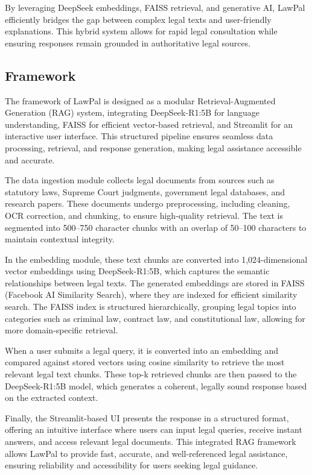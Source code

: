 By leveraging DeepSeek embeddings, FAISS retrieval, and generative AI, LawPal efficiently bridges the gap between complex legal texts and user-friendly explanations. This hybrid system allows for rapid legal consultation while ensuring responses remain grounded in authoritative legal sources.

\subsection{Framework}\label{AA} 

The framework of LawPal is designed as a modular Retrieval-Augmented Generation (RAG) system, integrating DeepSeek-R1:5B for language understanding, FAISS for efficient vector-based retrieval, and Streamlit for an interactive user interface. This structured pipeline ensures seamless data processing, retrieval, and response generation, making legal assistance accessible and accurate.  

The data ingestion module collects legal documents from sources such as statutory laws, Supreme Court judgments, government legal databases, and research papers. These documents undergo preprocessing, including cleaning, OCR correction, and chunking, to ensure high-quality retrieval. The text is segmented into 500–750 character chunks with an overlap of 50–100 characters to maintain contextual integrity.  

In the embedding module, these text chunks are converted into 1,024-dimensional vector embeddings using DeepSeek-R1:5B, which captures the semantic relationships between legal texts. The generated embeddings are stored in FAISS (Facebook AI Similarity Search), where they are indexed for efficient similarity search. The FAISS index is structured hierarchically, grouping legal topics into categories such as criminal law, contract law, and constitutional law, allowing for more domain-specific retrieval.  

When a user submits a legal query, it is converted into an embedding and compared against stored vectors using cosine similarity to retrieve the most relevant legal text chunks. These top-k retrieved chunks are then passed to the DeepSeek-R1:5B model, which generates a coherent, legally sound response based on the extracted context.  

Finally, the Streamlit-based UI presents the response in a structured format, offering an intuitive interface where users can input legal queries, receive instant answers, and access relevant legal documents. This integrated RAG framework allows LawPal to provide fast, accurate, and well-referenced legal assistance, ensuring reliability and accessibility for users seeking legal guidance.